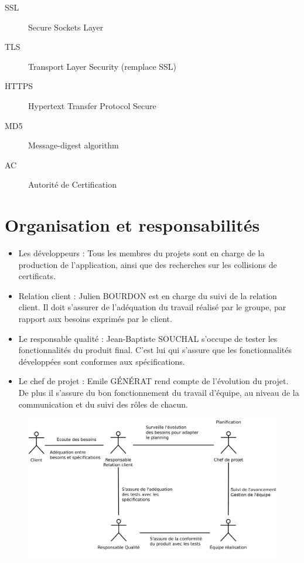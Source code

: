 \documentclass[a4paper,11pt,french]{article}
\begin{document}
\begin{description}
\item[SSL] Secure Sockets Layer
\item[TLS] Transport Layer Security (remplace SSL)
\item[HTTPS] Hypertext Transfer Protocol Secure
\item[MD5] Message-digest algorithm
\item[AC] Autorité de Certification
\end{description}


\newpage
\section{Organisation et responsabilités}

\begin{itemize}
\item Les développeurs : Tous les membres du projets sont en charge de la production de l'application, ainsi que des recherches sur les collisions de certificats.

\item Relation client : Julien BOURDON est en charge du suivi de la relation client. Il doit s'assurer de l'adéquation du travail réalisé par le groupe, par rapport aux besoins exprimés par le client.

\item Le responsable qualité : Jean-Baptiste SOUCHAL s'occupe de tester les fonctionnalités du produit final. C'est lui qui s'assure que les fonctionnalités développées sont conformes aux spécifications.

\item Le chef de projet : Emile GÉNÉRAT rend compte de l'évolution du projet. De plus il s'assure du bon fonctionnement du travail d'équipe, au niveau de la communication et du suivi des rôles de chacun.
\end{itemize}

\begin{figure}[h!]
\includegraphics[width=\textwidth]{images/interaction_acteurs.pdf}
\end{figure}
\end{document}
